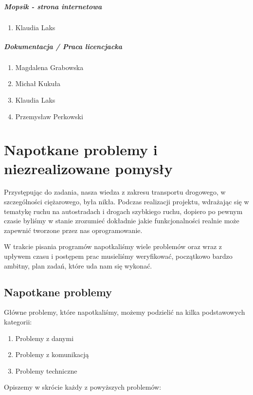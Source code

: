 \paragraph{Mopsik - strona internetowa}
\begin{enumerate}
\item Klaudia Laks
\end{enumerate}

\paragraph{Dokumentacja / Praca licencjacka}
\begin{enumerate}
\item Magdalena Grabowska
\item Michał Kukuła
\item Klaudia Laks
\item Przemysław Perkowski
\end{enumerate}

\chapter{Napotkane problemy i niezrealizowane pomysły}

Przystępując do zadania, nasza wiedza z zakresu transportu drogowego, w szczególności ciężarowego, była nikła. Podczas realizacji projektu, wdrażając się  w tematykę ruchu na autostradach i drogach szybkiego ruchu, dopiero po pewnym czasie byliśmy w stanie zrozumieć dokładnie jakie funkcjonalności realnie może zapewnić tworzone przez nas oprogramowanie.

W trakcie pisania programów napotkaliśmy wiele problemów oraz wraz z upływem czasu i postępem prac musieliśmy weryfikować, początkowo bardzo ambitny, plan zadań, które uda nam się wykonać.

\section{Napotkane problemy}
Główne problemy, które napotkaliśmy, możemy podzielić na kilka podstawowych kategorii:
\begin{enumerate}
\item Problemy z danymi
\item Problemy z komunikacją
\item Problemy techniczne
\end{enumerate}
Opiszemy w skrócie każdy z powyższych problemów:
